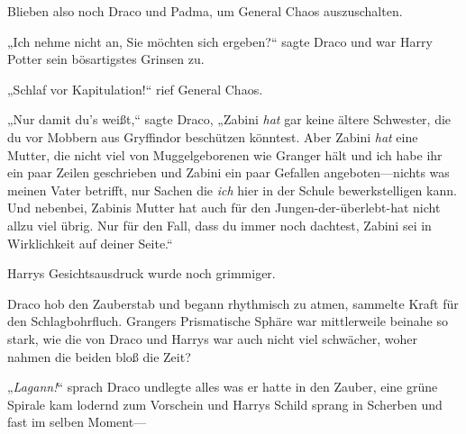 Blieben also noch Draco und Padma, um General Chaos auszuschalten.

„Ich nehme nicht an, Sie möchten sich ergeben?“ sagte Draco und war Harry Potter sein bösartigstes Grinsen zu.

„Schlaf vor Kapitulation!“ rief General Chaos.

„Nur damit du’s weißt,“ sagte Draco, „Zabini \emph{hat} gar keine ältere Schwester, die du vor Mobbern aus Gryffindor beschützen könntest. Aber Zabini \emph{hat} eine Mutter, die nicht viel von Muggelgeborenen wie Granger hält und ich habe ihr ein paar Zeilen geschrieben und Zabini ein paar Gefallen angeboten—nichts was meinen Vater betrifft, nur Sachen die \emph{ich} hier in der Schule bewerkstelligen kann. Und nebenbei, Zabinis Mutter hat auch für den Jungen-der-überlebt-hat nicht allzu viel übrig. Nur für den Fall, dass du immer noch dachtest, Zabini sei in Wirklichkeit auf deiner Seite.“

Harrys Gesichtsausdruck wurde noch grimmiger.

Draco hob den Zauberstab und begann rhythmisch zu atmen, sammelte Kraft für den Schlagbohrfluch. Grangers Prismatische Sphäre war mittlerweile beinahe so stark, wie die von Draco und Harrys war auch nicht viel schwächer, woher nahmen die beiden bloß die Zeit?

„\emph{Lagann!}“ sprach Draco undlegte alles was er hatte in den Zauber, eine grüne Spirale kam lodernd zum Vorschein und Harrys Schild sprang in Scherben und fast im selben Moment—

